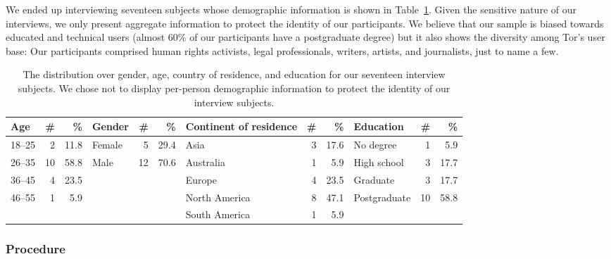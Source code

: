 We ended up interviewing seventeen subjects whose demographic information is
shown in Table~\ref{tab:interviewees}.  Given the sensitive nature of our
interviews, we only present aggregate information to protect the identity of our
participants.  We believe that our sample is biased towards educated and
technical users (almost 60\% of our participants have a postgraduate degree) but
it also shows the diversity among Tor's user base: Our participants comprised
human rights activists, legal professionals, writers, artists, and journalists,
just to name a few.

\begin{table}[ht]
	\centering
	\begin{tabular}{l r r | l r r | l r r | l r r}
	\toprule
	Age & \# & \% &
	Gender & \# & \% &
	Continent of residence & \# & \% &
	Education & \# & \% \\
	\midrule
	18--25 & 2  & 11.8 & Female & 5  & 29.4 & Asia          & 3 & 17.6 & No degree    & 1  & 5.9 \\
	26--35 & 10 & 58.8 & Male   & 12 & 70.6 & Australia     & 1 &  5.9 & High school  & 3  & 17.7 \\
	36--45 & 4  & 23.5 &        &    &      & Europe        & 4 & 23.5 & Graduate     & 3  & 17.7 \\
	46--55 & 1  & 5.9  &        &    &      & North America & 8 & 47.1 & Postgraduate & 10 & 58.8 \\
	       &    &      &        &    &      & South America & 1 &  5.9 & & & \\
	\bottomrule
	\end{tabular}
	\caption{The distribution over gender, age, country of residence, and
	education for our seventeen interview subjects.  We chose not to display
	per-person demographic information to protect the identity of our interview
	subjects.}
	\label{tab:interviewees}
\end{table}

\subsubsection{Procedure}

